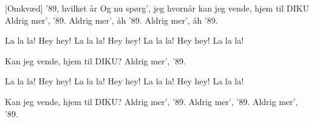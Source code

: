 \documentclass[a4paper,11pt]{article}
\begin{document}
\begin{song}
[Omkv\ae{}d]
'89, hvilket \aa{}r
Og nu sp\o{}rg', jeg hvorn\aa{}r
kan jeg vende, hjem til DIKU
Aldrig mer', '89.
Aldrig mer', \aa{}h '89.
Aldrig mer', \aa{}h '89.


La la la! Hey hey!
La la la! Hey hey!
La la la! Hey hey!
La la la!

Kan jeg vende, hjem til DIKU?
Aldrig mer', '89.

La la la! Hey hey!
La la la! Hey hey!
La la la! Hey hey!
La la la!

Kan jeg vende, hjem til DIKU?
Aldrig mer', '89.
Aldrig mer', '89.
Aldrig mer', '89.
\end{song}
\end{document}

